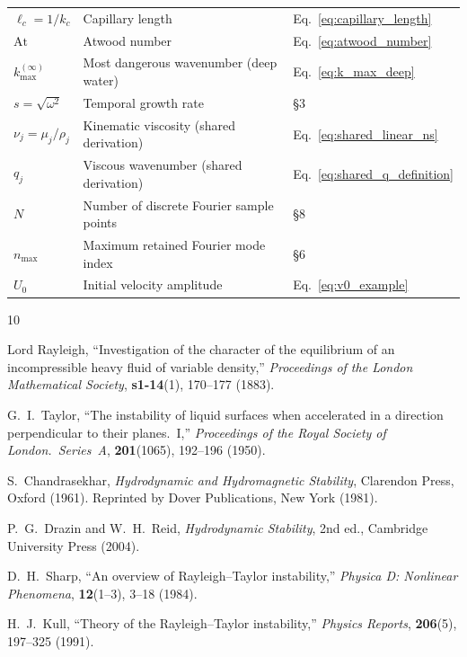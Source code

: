 \documentclass[11pt,a4paper]{article}
\begin{document}
\begin{table}[ht]
\begin{tabular}{lll}
$\ell_c=1/k_c$ & Capillary length & Eq.~\eqref{eq:capillary_length} \\
$\mathrm{At}$ & Atwood number & Eq.~\eqref{eq:atwood_number} \\
$k_{\max}^{(\infty)}$ & Most dangerous wavenumber (deep water) & Eq.~\eqref{eq:k_max_deep} \\
$s=\sqrt{\omega^2}$ & Temporal growth rate & \S3 \\
$\nu_j=\mu_j/\rho_j$ & Kinematic viscosity (shared derivation) & Eq.~\eqref{eq:shared_linear_ns} \\
$q_j$ & Viscous wavenumber (shared derivation) & Eq.~\eqref{eq:shared_q_definition} \\
$N$ & Number of discrete Fourier sample points & \S8 \\
$n_{\max}$ & Maximum retained Fourier mode index & \S6 \\
$U_0$ & Initial velocity amplitude & Eq.~\eqref{eq:v0_example} \\
\hline
\end{tabular}
\end{table}

\begin{thebibliography}{10}

Lord Rayleigh,
``Investigation of the character of the equilibrium of an incompressible heavy fluid of variable density,''
\textit{Proceedings of the London Mathematical Society},
\textbf{s1-14}(1), 170--177 (1883).

G.~I.~Taylor,
``The instability of liquid surfaces when accelerated in a direction perpendicular to their planes.~I,''
\textit{Proceedings of the Royal Society of London.\ Series~A},
\textbf{201}(1065), 192--196 (1950).

S.~Chandrasekhar,
\textit{Hydrodynamic and Hydromagnetic Stability},
Clarendon Press, Oxford (1961).
Reprinted by Dover Publications, New York (1981).

P.~G.~Drazin and W.~H.~Reid,
\textit{Hydrodynamic Stability},
2nd ed., Cambridge University Press (2004).

D.~H.~Sharp,
``An overview of Rayleigh--Taylor instability,''
\textit{Physica D: Nonlinear Phenomena},
\textbf{12}(1--3), 3--18 (1984).

H.~J.~Kull,
``Theory of the Rayleigh--Taylor instability,''
\textit{Physics Reports},
\textbf{206}(5), 197--325 (1991).

\end{thebibliography}
\end{document}
